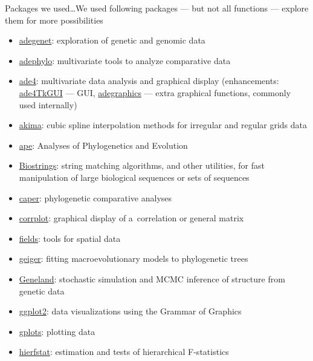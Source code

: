 \documentclass[compress, ucs, xelatex, 11pt, xcolor=svgnames,
  hyperref={
    bookmarks=true,
    unicode=true,
    colorlinks=true,
    pdftitle={Molecular data in R},
    plainpages=false,
    pdfauthor={Vojtech Zeisek},
    pdfsubject={Course about phylogeny and evolution in R},
    pdfcreator={XeLaTeX},
    pdfkeywords={R, evolution, phylogeny, molecular data},
    linkcolor=Tomato,
    anchorcolor=SaddleBrown,
    citecolor=Goldenrod,
    filecolor=DarkMagenta,
    menucolor=Sienna,
    urlcolor=DarkTurquoise,
    pdftex},
  url={hyphens, lowtilde} %
  ]{beamer}
\begin{document}
\begin{frame}[allowframebreaks]{Packages we used\ldots}{We used following packages --- but not all functions --- explore them for more possibilities}
  \begin{itemize}
    \item \href{https://CRAN.R-project.org/package=adegenet}{adegenet}: exploration of genetic and genomic data
    \item \href{https://CRAN.R-project.org/package=adephylo}{adephylo}: multivariate tools to analyze comparative data
    \item \href{https://CRAN.R-project.org/package=ade4}{ade4}: multivariate data analysis and graphical display (enhancements: \href{https://CRAN.R-project.org/package=ade4TkGUI}{ade4TkGUI} --- GUI, \href{https://CRAN.R-project.org/package=adegraphics}{adegraphics} --- extra graphical functions, commonly used internally)
    \item \href{https://CRAN.R-project.org/package=akima}{akima}: cubic spline interpolation methods for irregular and regular grids data
    \item \href{https://CRAN.R-project.org/package=ape}{ape}: Analyses of Phylogenetics and Evolution
    \item \href{https://www.bioconductor.org/packages/release/bioc/html/Biostrings.html}{Biostrings}: string matching algorithms, and other utilities, for fast manipulation of large biological sequences or sets of sequences
    \item \href{https://CRAN.R-project.org/package=caper}{caper}: phylogenetic comparative analyses
    \item \href{https://CRAN.R-project.org/package=corrplot}{corrplot}: graphical display of a~correlation or general matrix
    \item \href{https://CRAN.R-project.org/package=fields}{fields}: tools for spatial data
    \item \href{https://CRAN.R-project.org/package=geiger}{geiger}: fitting macroevolutionary models to phylogenetic trees
    \item \href{https://www2.imm.dtu.dk/~gigu/Geneland/}{Geneland}: stochastic simulation and MCMC inference of structure from genetic data
    \item \href{https://CRAN.R-project.org/package=ggplot2}{ggplot2}: data visualizations using the Grammar of Graphics
    \item \href{https://CRAN.R-project.org/package=gplots}{gplots}: plotting data
    \item \href{https://CRAN.R-project.org/package=hierfstat}{hierfstat}: estimation and tests of hierarchical F-statistics

\end{itemize}
\end{frame}
\end{document}
